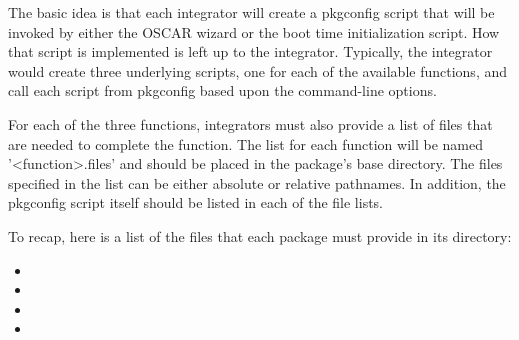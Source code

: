 The basic idea is that each integrator will create a pkgconfig script
that will be invoked by either the OSCAR wizard or the boot time
initialization script. How that script is implemented is left up to
the integrator. Typically, the integrator would create three
underlying scripts, one for each of the available functions, and call
each script from pkgconfig based upon the command-line options.

For each of the three functions, integrators must also provide a list
of files that are needed to complete the function. The list for each
function will be named '<function>.files' and should be placed in the
package's base directory. The files specified in the list can be
either absolute or relative pathnames. In addition, the pkgconfig
script itself should be listed in each of the file lists.

To recap, here is a list of the files that each package must provide
in its directory:

\begin{itemize}
\item {}
\item {}
\item {}
\item {}
\end{itemize}

